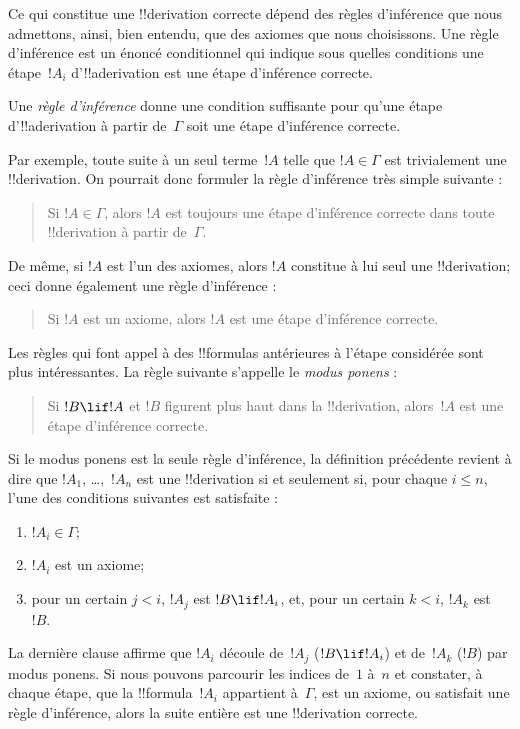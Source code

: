 \documentclass[11pt,a4paper,openany]{memoir}
\begin{document}
Ce qui constitue une !!{derivation} correcte dépend des règles
d'inférence que nous admettons, ainsi, bien entendu, que des axiomes
que nous choisissons. Une règle d'inférence est un énoncé conditionnel
qui indique sous quelles conditions une étape~$!A_i$ d'!!a{derivation}
est une étape d'inférence correcte.

\begin{defn}
Une \emph{règle d'inférence} donne une condition suffisante pour
qu'une étape d'!!a{derivation} à partir de~$\Gamma$ soit une étape
d'inférence correcte.
\end{defn}

Par exemple, toute suite à un seul terme~$!A$ telle que
$!A \in \Gamma$ est trivialement une !!{derivation}. On pourrait donc
formuler la règle d'inférence très simple suivante :
\begin{quote}
  Si $!A \in \Gamma$, alors $!A$ est toujours une étape d'inférence
  correcte dans toute !!{derivation} à partir de~$\Gamma$.
\end{quote}
De même, si $!A$ est l'un des axiomes, alors $!A$ constitue à lui seul
une !!{derivation}; ceci donne également une règle d'inférence :
\begin{quote}
  Si $!A$ est un axiome, alors $!A$ est une étape d'inférence correcte.
\end{quote}
Les règles qui font appel à des !!{formula}s antérieures à l'étape
considérée sont plus intéressantes. La règle suivante s'appelle le
\emph{modus ponens} :
\begin{quote}
  Si $!B \lif !A$ et $!B$ figurent plus haut dans la !!{derivation},
  alors~$!A$ est une étape d'inférence correcte.
\end{quote}
Si le modus ponens est la seule règle d'inférence, la définition
précédente revient à dire que $!A_1$, \dots,~$!A_n$ est une
!!{derivation} si et seulement si, pour chaque $i \le n$, l'une des
conditions suivantes est satisfaite :
\begin{enumerate}
\item $!A_i \in \Gamma$;
\item $!A_i$ est un axiome;
\item pour un certain $j < i$, $!A_j$ est $!B \lif !A_i$, et, pour un
  certain $k < i$, $!A_k$ est~$!B$.
\end{enumerate}
La dernière clause affirme que $!A_i$ découle de~$!A_j$
($!B \lif !A_i$) et de~$!A_k$ ($!B$) par modus ponens. Si nous pouvons
parcourir les indices de~$1$ à~$n$ et constater, à chaque étape, que
la !!{formula}~$!A_i$ appartient à~$\Gamma$, est un axiome, ou satisfait
une règle d'inférence, alors la suite entière est une !!{derivation}
correcte.
\end{document}
